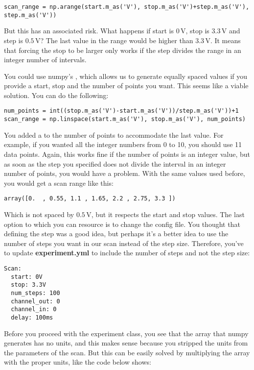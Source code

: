 \begin{verbatim}
scan_range = np.arange(start.m_as('V'), stop.m_as('V')+step.m_as('V'), step.m_as('V'))
\end{verbatim}

But this has an associated risk. What happens if start is $0\,\textrm{V}$, stop is $3.3\,\textrm{V}$ and step is $0.5\,\textrm{V}$? The last value in the range would be higher than $3.3\,\textrm{V}$. It means that forcing the stop to be larger only works if the step divides the range in an integer number of intervals.

You could use numpy's , which allows us to generate equally spaced values if you provide a start, stop and the number of points you want. This seems like a viable solution. You can do the following:

\begin{verbatim}
num_points = int((stop.m_as('V')-start.m_as('V'))/step.m_as('V'))+1
scan_range = np.linspace(start.m_as('V'), stop.m_as('V'), num_points)
\end{verbatim}

You added a  to the number of points to accommodate the last value. For example, if you wanted all the integer numbers from 0 to 10, you should use 11 data points. Again, this works fine if the number of points is an integer value, but as soon as the step you specified does not divide the interval in an integer number of points, you would have a problem. With the same values used before, you would get a scan range like this:

\begin{verbatim}
array([0.  , 0.55, 1.1 , 1.65, 2.2 , 2.75, 3.3 ])
\end{verbatim}

Which is not spaced by $0.5\,\textrm{V}$, but it respects the start and stop values. The last option to which you can resource is to change the config file. You thought that defining the step was a good idea, but perhaps it's a better idea to use the number of steps you want in our scan instead of the step size. Therefore, you've to update \textbf{experiment.yml} to include the number of steps and not the step size:

\begin{verbatim}
Scan:
  start: 0V
  stop: 3.3V
  num_steps: 100
  channel_out: 0
  channel_in: 0
  delay: 100ms
\end{verbatim}

Before you proceed with the experiment class, you see that the array that numpy generates has no units, and this makes sense because you stripped the units from the parameters of the scan. But this can be easily solved by multiplying the array with the proper units, like the code below shows:

